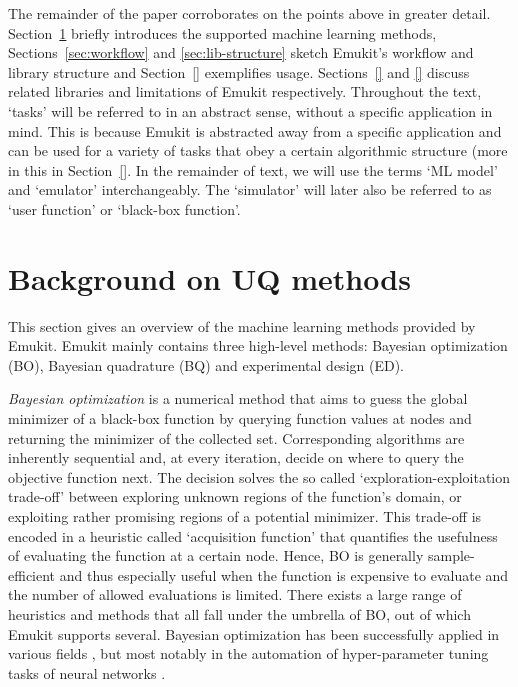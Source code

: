 The remainder of the paper corroborates on the points above in greater detail. Section~\ref{sec:background} briefly introduces the supported machine learning methods, Sections~\ref{sec:workflow} and \ref{sec:lib-structure} sketch Emukit's workflow and library structure and Section~\ref{} exemplifies usage. Sections~\ref{} and \ref{} discuss related libraries and limitations of Emukit respectively. Throughout the text, `tasks' will be referred to in an abstract sense, without a specific application in mind. This is because Emukit is abstracted away from a specific application and can be used for a variety of tasks that obey a certain algorithmic structure (more in this in Section~\ref{}. In the remainder of text, we will use the terms `ML model' and `emulator' interchangeably. The `simulator' will later also be referred to as `user function' or `black-box function'.

\section{Background on UQ methods}\label{sec:background}

This section gives an overview of the machine learning methods provided by Emukit.
Emukit mainly contains three high-level methods: Bayesian optimization (BO), Bayesian quadrature (BQ) and experimental design (ED).

\emph{Bayesian optimization} \cite{Mockus1978} is a numerical method that aims to guess the global minimizer of a black-box function by querying function values at nodes and returning the minimizer of the collected set. Corresponding algorithms are inherently sequential and, at every iteration, decide on where to query the objective function next. The decision solves the so called `exploration-exploitation trade-off' between exploring unknown regions of the function's domain, or exploiting rather promising regions of a potential minimizer. This trade-off is encoded in a heuristic called `acquisition function' that quantifies the usefulness of evaluating the function at a certain node. Hence, BO is generally sample-efficient and thus especially useful when the function is expensive to evaluate and the number of allowed evaluations is limited. There exists a large range of heuristics and methods that all fall under the umbrella of BO, out of which Emukit supports several. Bayesian optimization has been successfully applied in various fields , but most notably in the automation of hyper-parameter tuning tasks of neural networks \cite{snoek2012practical}.

